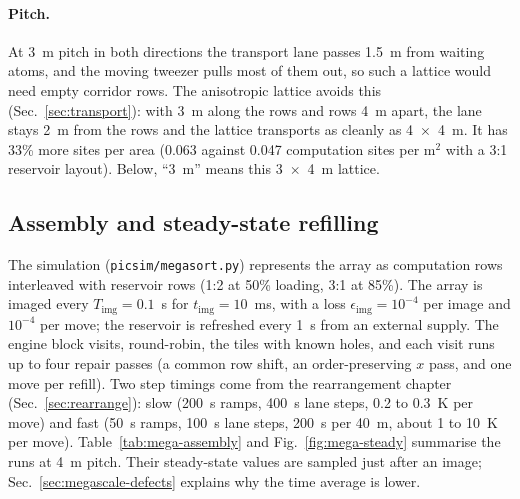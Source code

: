 \paragraph{Pitch.} At 3~\textmu m pitch in both directions the transport lane passes 1.5~\textmu m from waiting atoms, and the moving tweezer pulls most of them out, so such a lattice would need empty corridor rows. The anisotropic lattice avoids this (Sec.~\ref{sec:transport}): with 3~\textmu m along the rows and rows 4~\textmu m apart, the lane stays 2~\textmu m from the rows and the lattice transports as cleanly as 4~$\times$~4~\textmu m. It has 33\% more sites per area (0.063 against 0.047 computation sites per \textmu m$^2$ with a 3:1 reservoir layout). Below, ``3~\textmu m'' means this 3~$\times$~4~\textmu m lattice.

\subsection{Assembly and steady-state refilling}\label{sec:megascale-steady}

The simulation (\texttt{picsim/megasort.py}) represents the array as computation rows interleaved with reservoir rows (1:2 at 50\% loading, 3:1 at 85\%). The array is imaged every $T_\mathrm{img}=0.1$~s for $t_\mathrm{img}=10$~ms, with a loss $\epsilon_\mathrm{img}=10^{-4}$ per image and $10^{-4}$ per move; the reservoir is refreshed every 1~s from an external supply. The engine block visits, round-robin, the tiles with known holes, and each visit runs up to four repair passes (a common row shift, an order-preserving $x$ pass, and one move per refill). Two step timings come from the rearrangement chapter (Sec.~\ref{sec:rearrange}): slow (200~\textmu s ramps, 400~\textmu s lane steps, 0.2 to 0.3~\textmu K per move) and fast (50~\textmu s ramps, 100~\textmu s lane steps, 200~\textmu s per 40~\textmu m, about 1 to 10~\textmu K per move). Table~\ref{tab:mega-assembly} and Fig.~\ref{fig:mega-steady} summarise the runs at 4~\textmu m pitch. Their steady-state values are sampled just after an image; Sec.~\ref{sec:megascale-defects} explains why the time average is lower.

